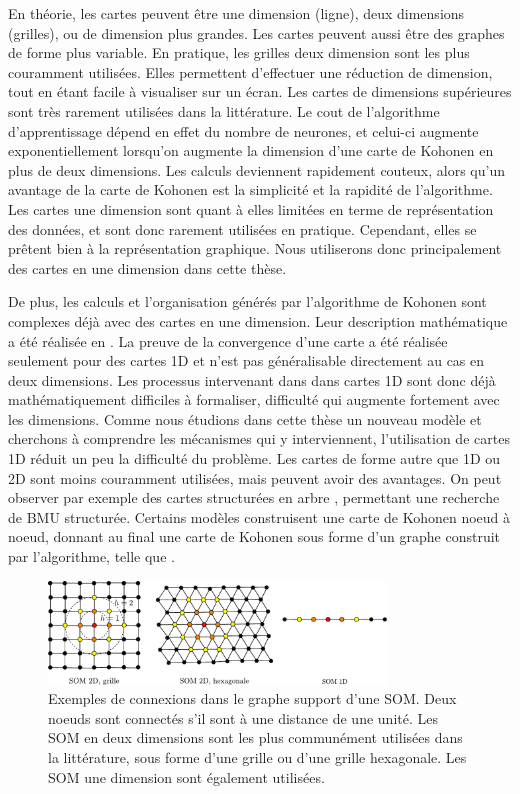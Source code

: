 \documentclass[../main]{subfiles}
\begin{document}
En théorie, les cartes peuvent être une dimension (ligne), deux dimensions (grilles), ou de dimension plus grandes. Les cartes peuvent aussi être des graphes de forme plus variable. En pratique, les grilles deux dimension sont les plus couramment utilisées. Elles permettent d'effectuer une réduction de dimension, tout en étant facile à visualiser sur un écran. Les cartes de dimensions supérieures sont très rarement utilisées dans la littérature. Le cout de l'algorithme d'apprentissage dépend en effet du nombre de neurones, et celui-ci augmente exponentiellement lorsqu'on augmente la dimension d'une carte de Kohonen en plus de deux dimensions. Les calculs deviennent rapidement couteux, alors qu'un avantage de la carte de Kohonen est la simplicité et la rapidité de l'algorithme. Les cartes une dimension sont quant à elles limitées en terme de représentation des données, et sont donc rarement utilisées en pratique. Cependant, elles se prêtent bien à la représentation graphique. Nous utiliserons donc principalement des cartes en une dimension dans cette thèse.


De plus, les calculs et l'organisation générés par l'algorithme de Kohonen sont complexes déjà avec des cartes en une dimension. Leur description mathématique a été réalisée en \cite{cottrell_theoretical_2016,cottrell_theoretical_1998,fort_soms_2006}. La preuve de la convergence d'une carte a été réalisée seulement pour des cartes 1D et n'est pas généralisable directement au cas en deux dimensions. Les processus intervenant dans dans cartes 1D sont donc déjà mathématiquement difficiles à formaliser, difficulté qui augmente fortement avec les dimensions.
Comme nous étudions dans cette thèse un nouveau modèle et cherchons à comprendre les mécanismes qui y interviennent, l'utilisation de cartes 1D réduit un peu la difficulté du problème. 
Les cartes de forme autre que 1D ou 2D sont moins couramment utilisées, mais peuvent avoir des avantages. On peut observer par exemple des cartes structurées en arbre \cite{koikkalainen_self-organizing_1990}, permettant une recherche de BMU structurée. Certains modèles construisent une carte de Kohonen noeud à noeud, donnant au final une carte de Kohonen sous forme d'un graphe construit par l'algorithme, telle que \cite{alahakoon_dynamic_2000}.

\begin{figure}
\centering
\includegraphics[width=0.8\textwidth]{soms_topologies}
\caption{Exemples de connexions dans le graphe support d'une SOM. Deux noeuds sont connectés s'il sont à une distance de une unité. Les SOM en deux dimensions sont les plus communément utilisées dans la littérature, sous forme d'une grille ou d'une grille hexagonale. Les SOM une dimension sont également utilisées.}
\label{fig:topo}
\end{figure}
\end{document}
